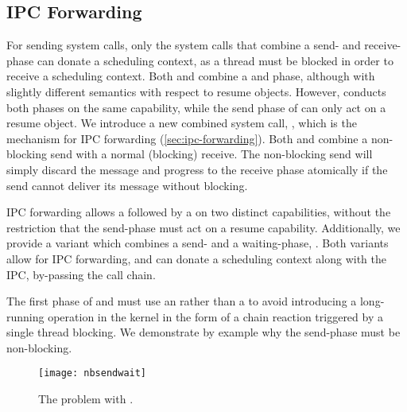 \subsection{IPC Forwarding}
\label{s:ipc-forwarding}

For sending system calls, only the system calls that combine a send- and receive-phase can donate
a scheduling context, as a thread must be blocked in order to receive a scheduling context. Both
\call and \replyrecv combine a \send and \recv phase, although with slightly different semantics
with respect to resume objects. However, \call conducts both phases on the same capability, while
the send phase of \replyrecv can only act on a resume object. We introduce a new combined system
call, \nbsendrecv, which is the mechanism for IPC forwarding
(\cref{sec:ipc-forwarding}).
Both \nbsendrecv and \replyrecv combine a non-blocking send with a normal (blocking) receive. 
The non-blocking send will simply
discard the message and progress to the receive phase atomically if the send cannot deliver its
message without blocking.

IPC forwarding allows a \nbsend followed by a \recv on two distinct capabilities, without the
restriction that the send-phase must act on a resume capability. 
Additionally, we provide a variant which combines a send- and a waiting-phase, \nbsendwait.
Both variants allow for IPC forwarding, and can donate a scheduling context
along with the IPC, by-passing the call chain. 

The first phase of \nbsendrecv and \nbsendwait must use an \nbsend rather than a \send
to avoid introducing a long-running operation in the kernel in the form of a chain reaction
triggered by a single thread blocking. We demonstrate by example why the send-phase must be
non-blocking.

\begin{figure}
    \texttt{[image: nbsendwait]}
    \caption{The problem with \sendrecv.}
    \label{fig:send-wait}
\end{figure}

